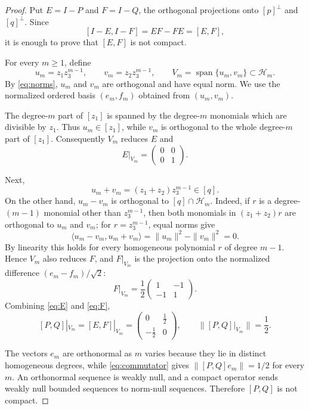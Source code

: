 \documentclass[11pt]{article}
\begin{document}
\begin{proof}
Put $E=I-P$ and $F=I-Q$, the orthogonal projections onto $[p]^\perp$ and
$[q]^\perp$. Since
\[
              [I-E,I-F]=EF-FE=[E,F],
\]
it is enough to prove that $[E,F]$ is not compact.

For every $m\ge1$, define
\[
 u_m=z_1z_3^{m-1},\qquad v_m=z_2z_3^{m-1},\qquad
 V_m=\operatorname{span}\{u_m,v_m\}\subset\mathcal H_m.
\]
By \eqref{eq:norms}, $u_m$ and $v_m$ are orthogonal and have equal norm.
We use the normalized ordered basis $(e_m,f_m)$ obtained from $(u_m,v_m)$.

The degree-$m$ part of $[z_1]$ is spanned by the degree-$m$ monomials which
are divisible by $z_1$. Thus $u_m\in[z_1]$, while $v_m$ is orthogonal to the
whole degree-$m$ part of $[z_1]$. Consequently $V_m$ reduces $E$ and
\begin{equation}\label{eq:E}
                  E|_{V_m}=\begin{pmatrix}0&0\\0&1\end{pmatrix}.
\end{equation}

Next,
\[
             u_m+v_m=(z_1+z_2)z_3^{m-1}\in[q].
\]
On the other hand, $u_m-v_m$ is orthogonal to $[q]\cap\mathcal H_m$.
Indeed, if $r$ is a degree-$(m-1)$ monomial other than $z_3^{m-1}$, then
both monomials in $(z_1+z_2)r$ are orthogonal to $u_m$ and $v_m$; for
$r=z_3^{m-1}$, equal norms give
\[
       \langle u_m-v_m,u_m+v_m\rangle=\|u_m\|^2-\|v_m\|^2=0.
\]
By linearity this holds for every homogeneous polynomial $r$ of degree
$m-1$. Hence $V_m$ also reduces $F$, and $F|_{V_m}$ is the projection onto
the normalized difference $(e_m-f_m)/\sqrt2$:
\begin{equation}\label{eq:F}
                  F|_{V_m}=\frac12\begin{pmatrix}1&-1\\-1&1\end{pmatrix}.
\end{equation}
Combining \eqref{eq:E} and \eqref{eq:F},
\begin{equation}\label{eq:commutator}
 [P,Q]|_{V_m}=[E,F]|_{V_m}
 =\begin{pmatrix}0&\tfrac12\\-\tfrac12&0\end{pmatrix},
 \qquad \|[P,Q]|_{V_m}\|=\frac12.
\end{equation}

The vectors $e_m$ are orthonormal as $m$ varies because they lie in distinct
homogeneous degrees, while \eqref{eq:commutator} gives
$\|[P,Q]e_m\|=1/2$ for every $m$. An orthonormal sequence is weakly null,
and a compact operator sends weakly null bounded sequences to norm-null
sequences. Therefore $[P,Q]$ is not compact.
\end{proof}
\end{document}
